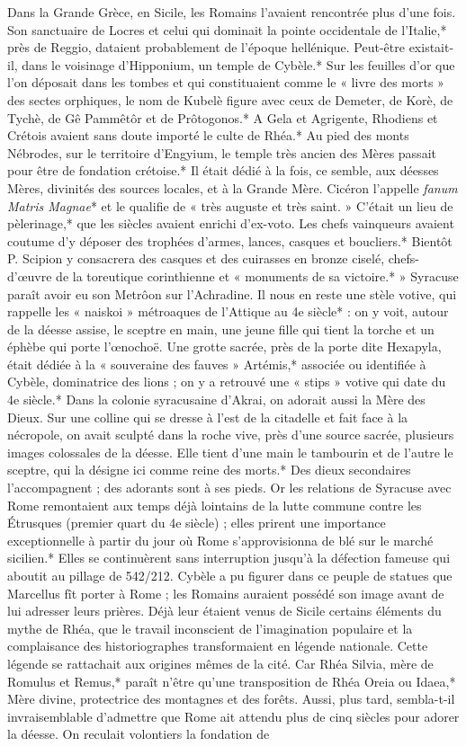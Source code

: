 \documentclass[a4paper, 11pt, oneside, polutonikogreek, french]{article}
\begin{document}
Dans la Grande Grèce, en Sicile, les Romains l'avaient rencontrée plus d'une fois. Son sanctuaire de Locres et celui qui dominait la pointe occidentale de l'Italie,* près de Reggio, dataient probablement de l'époque hellénique. Peut-être existait-il, dans le voisinage d'Hipponium, un temple de Cybèle.* Sur les feuilles d'or que l'on déposait dans les tombes et qui constituaient comme le « livre des morts » des sectes orphiques, le nom de Kubelè figure avec ceux de Demeter, de Korè, de Tychè, de Gê Pammêtôr et de Prôtogonos.* A Gela et Agrigente, Rhodiens et Crétois avaient sans doute importé le culte de Rhéa.* Au pied des monts Nébrodes, sur le territoire d'Engyium, le temple très ancien des Mères passait pour être de fondation crétoise.* Il était dédié à la fois, ce semble, aux déesses Mères, divinités des sources locales, et à la Grande Mère. Cicéron l'appelle \emph{fanum Matris Magnae}* et le qualifie de « très auguste et très saint. » C'était un lieu de pèlerinage,* que les siècles avaient enrichi d'ex-voto. Les chefs vainqueurs avaient coutume d'y déposer des trophées d'armes, lances, casques et boucliers.* Bientôt P. Scipion y consacrera des casques et des cuirasses en bronze ciselé, chefs-d'œuvre de la toreutique corinthienne et « monuments de sa victoire.* » Syracuse paraît avoir eu son Metrôon sur l'Achradine. Il nous en reste une stèle votive, qui rappelle les « naiskoi » métroaques de l'Attique au 4e siècle* : on y voit, autour de la déesse assise, le sceptre en main, une jeune fille qui tient la torche et un éphèbe qui porte l'œnochoë. Une grotte sacrée, près de la porte dite Hexapyla, était dédiée à la « souveraine des fauves » Artémis,* associée ou identifiée à Cybèle, dominatrice des lions ; on y a retrouvé une « stips » votive qui date du 4e siècle.* Dans la colonie syracusaine d'Akrai, on adorait aussi la Mère des Dieux. Sur une colline qui se dresse à l'est de la citadelle et fait face à la nécropole, on avait sculpté dans la roche vive, près d'une source sacrée, plusieurs images colossales de la déesse. Elle tient d'une main le tambourin et de l'autre le sceptre, qui la désigne ici comme reine des morts.* Des dieux secondaires l'accompagnent ; des adorants sont à ses pieds. Or les relations de Syracuse avec Rome remontaient aux temps déjà lointains de la lutte commune contre les Étrusques (premier quart du 4e siècle) ; elles prirent une importance exceptionnelle à partir du jour où Rome s'approvisionna de blé sur le marché sicilien.* Elles se continuèrent sans interruption jusqu'à la défection fameuse qui aboutit au pillage de 542/212. Cybèle a pu figurer dans ce peuple de statues que Marcellus fît porter à Rome ; les Romains auraient possédé son image avant de lui adresser leurs prières. Déjà leur étaient venus de Sicile certains éléments du mythe de Rhéa, que le travail inconscient de l'imagination populaire et la complaisance des historiographes transformaient en légende nationale. Cette légende se rattachait aux origines mêmes de la cité. Car Rhéa Silvia, mère de Romulus et Remus,* paraît n'être qu'une transposition de Rhéa Oreia ou Idaea,* Mère divine, protectrice des montagnes et des forêts. Aussi, plus tard, sembla-t-il invraisemblable d'admettre que Rome ait attendu plus de cinq siècles pour adorer la déesse. On reculait volontiers la fondation de 
\end{document}
